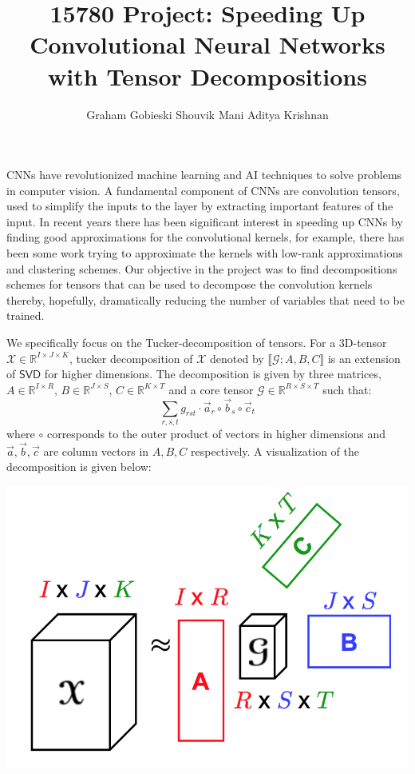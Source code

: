 \documentclass[a4paper]{article}
\title{\vspace{-2em} 15780 Project: Speeding Up Convolutional Neural Networks with Tensor Decompositions}
\author{Graham Gobieski \quad  Shouvik Mani \quad  Aditya Krishnan}
\date{ \vspace{-2em}}
\newcommand{\R}{\mathbb{R}}
\begin{document}
\maketitle

CNNs have revolutionized machine learning and AI techniques to solve problems in computer vision. A fundamental component of CNNs are convolution tensors, used to simplify the inputs to the layer by extracting important features of the input. In recent years there has been significant interest in speeding up CNNs by finding good approximations for the convolutional kernels, for example, there has been some work trying to approximate the kernels with low-rank approximations and clustering schemes. Our objective in the project was to find decompositions schemes for tensors that can be used to decompose the convolution kernels thereby, hopefully, dramatically reducing the number of variables that need to be trained. 

We specifically focus on the Tucker-decomposition of tensors. For a 3D-tensor $\mathcal{X} \in \R^{I \times J \times K}$, tucker decomposition of $\mathcal{X}$ denoted by $\llbracket \mathcal{G}; A, B, C \rrbracket$ is an extension of $\mathsf{SVD}$ for higher dimensions. The decomposition is given by three matrices, $A \in \R^{I \times R}$, $B \in \R^{J \times S}$, $C \in \R^{K \times T}$ and a core tensor $\mathcal{G} \in \R^{R \times S \times T}$ such that: 
$$ \sum_{r, s , t} g_{rst} \cdot \vec{a}_r \circ \vec{b}_s \circ \vec{c}_t  $$
where $\circ$ corresponds to the outer product of vectors in higher dimensions and $\vec{a}, \vec{b}, \vec{c}$ are column vectors in $A, B, C$ respectively. A visualization of the decomposition is given below: 
\begin{center}
\includegraphics[scale=0.3]{tucker}
\end{center}
\end{document}
